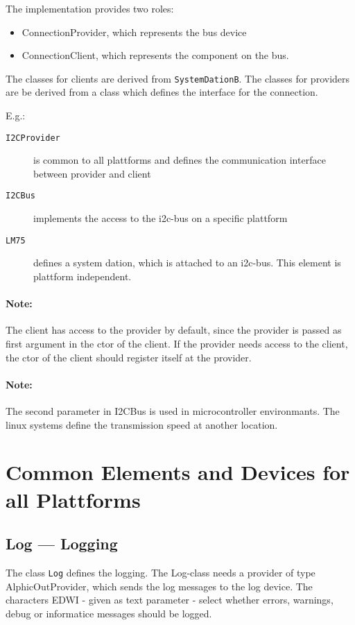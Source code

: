 The implementation provides two roles:
\begin{itemize}
\item ConnectionProvider, which represents the bus device
\item ConnectionClient, which represents the component on the bus.
\end{itemize}

The classes for clients are derived from \texttt{SystemDationB}.
The classes for providers are be derived from a class which
defines the interface for the connection. 

E.g.:
\begin{description} 
\item[ \texttt{I2CProvider} ] is common to all plattforms
   and defines the communication interface between provider and client
\item[ \texttt{I2CBus}] implements the access to the i2c-bus on a 
   specific plattform
\item[ \texttt{LM75} ] defines a system dation, which is attached to an i2c-bus.
    This element is plattform independent.
\end{description}

\paragraph{Note:} The client has access to the provider by default, since
the provider is passed as first argument in the ctor of the client.
If the provider needs access to the client, the ctor of the client
should register itself at the provider.


\paragraph{Note:} The second parameter in I2CBus is used in microcontroller
   environmants. The linux systems define the transmission speed at
   another location.

\section{Common Elements and Devices for all Plattforms}
\subsection{Log --- Logging}
The class \texttt{Log} defines the logging. The Log-class needs 
a provider of type AlphicOutProvider, which sends the log messages to the
log device.
The characters EDWI - given as text parameter - select whether
errors, warnings, debug or informatice messages should be logged.


